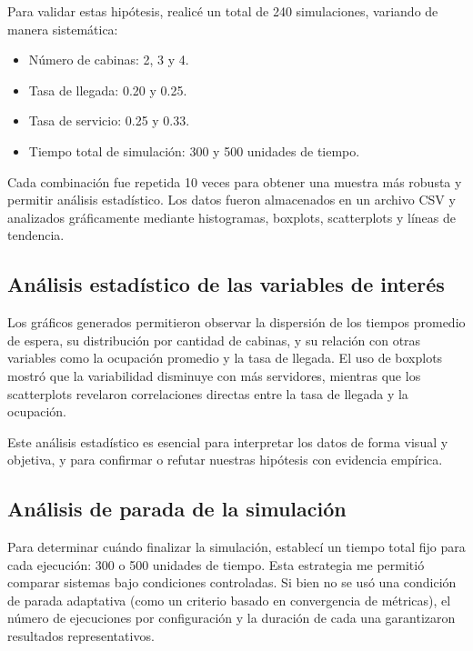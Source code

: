 \documentclass[12pt]{article}
\begin{document}
    Para validar estas hipótesis, realicé un total de 240 simulaciones, variando de manera sistemática:
    
    \begin{itemize}
      \item Número de cabinas: 2, 3 y 4.
      \item Tasa de llegada: 0.20 y 0.25.
      \item Tasa de servicio: 0.25 y 0.33.
      \item Tiempo total de simulación: 300 y 500 unidades de tiempo.
    \end{itemize}
    
    Cada combinación fue repetida 10 veces para obtener una muestra más robusta y permitir análisis estadístico. Los datos fueron almacenados en un archivo CSV y analizados gráficamente mediante histogramas, boxplots, scatterplots y líneas de tendencia.
    
    \subsection*{Análisis estadístico de las variables de interés}
    
    Los gráficos generados permitieron observar la dispersión de los tiempos promedio de espera, su distribución por cantidad de cabinas, y su relación con otras variables como la ocupación promedio y la tasa de llegada. El uso de boxplots mostró que la variabilidad disminuye con más servidores, mientras que los scatterplots revelaron correlaciones directas entre la tasa de llegada y la ocupación.
    
    Este análisis estadístico es esencial para interpretar los datos de forma visual y objetiva, y para confirmar o refutar nuestras hipótesis con evidencia empírica.
    
    \subsection*{Análisis de parada de la simulación}
    
    Para determinar cuándo finalizar la simulación, establecí un tiempo total fijo para cada ejecución: 300 o 500 unidades de tiempo. Esta estrategia me permitió comparar sistemas bajo condiciones controladas. Si bien no se usó una condición de parada adaptativa (como un criterio basado en convergencia de métricas), el número de ejecuciones por configuración y la duración de cada una garantizaron resultados representativos.
\end{document}
